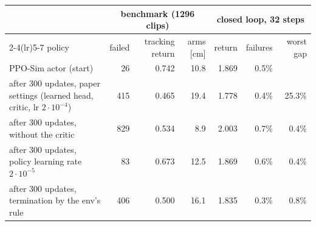\begin{tabular}{lrrrrrr}\toprule
 & \multicolumn{3}{c}{benchmark (1296 clips)} & \multicolumn{3}{c}{closed loop, 32 steps} \\
\cmidrule(lr){2-4}\cmidrule(lr){5-7}
policy & failed & tracking return & arms [cm] & return & failures & worst gap \\\midrule
PPO-Sim actor (start) & 26 & 0.742 & 10.8 & 1.869 & 0.5\% & \\\midrule
after 300 updates, paper settings (learned head, critic, lr $2\cdot10^{-4}$) & 415 & 0.465 & 19.4 & 1.778 & 0.4\% & 25.3\% \\
after 300 updates, without the critic & 829 & 0.534 & 8.9 & 2.003 & 0.7\% & 0.4\% \\
after 300 updates, policy learning rate $2\cdot10^{-5}$ & 83 & 0.673 & 12.5 & 1.869 & 0.6\% & 0.4\% \\
after 300 updates, termination by the env's rule & 406 & 0.500 & 16.1 & 1.835 & 0.3\% & 0.8\% \\
\bottomrule\end{tabular}
